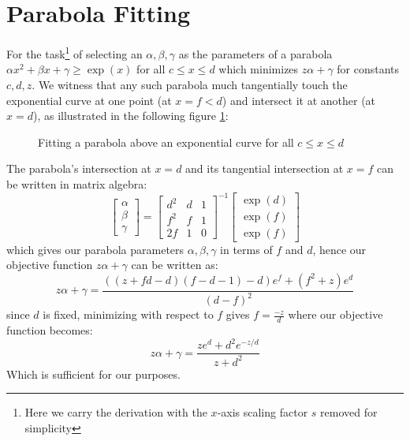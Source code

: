 \documentclass[aap,preprint]{imsart}
\begin{document}
\section{Parabola Fitting}\label{appendix1}
For the task\footnote{Here we carry the derivation with the $x$-axis scaling factor $s$ removed for simplicity} of selecting an $\alpha,\beta,\gamma$ as the parameters of a parabola $\alpha x^2+\beta x+\gamma\ge \exp(x)$ for all $c\le x\le d$ which minimizes $z\alpha+\gamma$ for constants $c,d,z$.
We witness that any such parabola much tangentially touch the exponential curve at one point (at $x=f<d$) and intersect it at another (at $x=d$), as illustrated in the following figure \ref{fig:graph1}:
\begin{figure}[h]
\caption{\footnotesize Fitting a parabola above an exponential curve for all $c\le x\le d$}
\label{fig:graph1}
\end{figure}
The parabola's intersection at $x=d$ and its tangential intersection at $x=f$ can be written in matrix algebra:
$$
\begin{bmatrix}
    \alpha \\
    \beta \\
	\gamma
\end{bmatrix}
=
\begin{bmatrix}
    d^2 & d & 1 \\
    f^2 & f & 1 \\
	2f  & 1 & 0
\end{bmatrix}^{-1}
\begin{bmatrix}
    \exp(d) \\
    \exp(f) \\
	\exp(f)
\end{bmatrix}$$
which gives our parabola parameters $\alpha,\beta,\gamma$ in terms of $f$ and $d$, hence our objective function $z\alpha+\gamma$ can be written as:
$$z\alpha+\gamma = \frac{((z+fd-d)(f-d-1)-d)e^f+(f^2+z)e^d}{(d-f)^2}$$
since $d$ is fixed, minimizing with respect to $f$ gives $f=\frac{-z}{d}$ where our objective function becomes:
$$z\alpha+\gamma = \frac{ze^d + d^2e^{-z/d}}{z + d^2}$$
Which is sufficient for our purposes.
\end{document}
